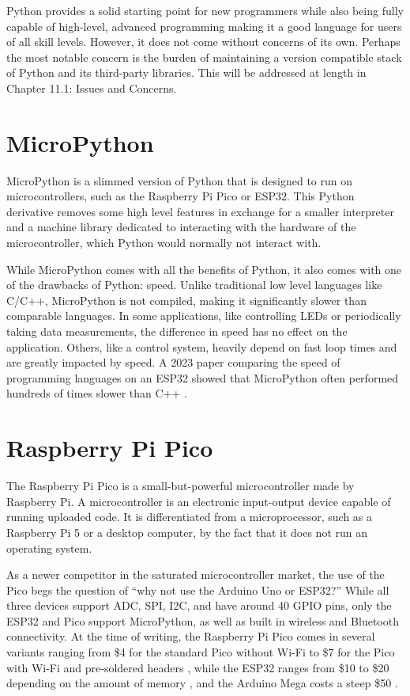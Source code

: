 Python provides a solid starting point for new programmers while also being fully capable of high-level,
advanced programming making it a good language for users of all skill levels. However, it does not come 
without concerns of its own. Perhaps the most notable concern is the burden of maintaining a version compatible
stack of Python and its third-party libraries. This will be addressed at length in Chapter 11.1: 
Issues and Concerns.

\section{MicroPython}

MicroPython is a slimmed version of Python that is designed to run on microcontrollers, such as the
Raspberry Pi Pico or ESP32. This Python derivative removes some high level features in exchange for
a smaller interpreter and a machine library dedicated to interacting with the hardware of the 
microcontroller, which Python would normally not interact with.

While MicroPython comes with all the benefits of Python, it also comes with one of the drawbacks
of Python: speed. Unlike traditional low level languages like C/C++, MicroPython is not compiled,
making it significantly slower than comparable languages. In some applications, like controlling LEDs
or periodically taking data measurements, the difference in
speed has no effect on the application. Others, like a control system, heavily depend on fast loop
times and are greatly impacted by speed. A 2023 paper comparing the speed of programming languages
on an ESP32 showed that MicroPython often performed hundreds of times slower than C++
\cite{language-speed}.

\section{Raspberry Pi Pico}

The Raspberry Pi Pico is a small-but-powerful microcontroller made by Raspberry Pi. A microcontroller
is an electronic input-output device capable of running uploaded code. It is differentiated
from a microprocessor, such as a Raspberry Pi 5 or a desktop computer, by the fact that it does not run 
an operating system. 

As a newer competitor in the saturated microcontroller market, the use of the Pico begs the question of 
``why not use the Arduino Uno or ESP32?'' While all three devices support ADC, SPI, I2C, and have 
around 40 GPIO pins, only the ESP32 and Pico support MicroPython, as well as built in wireless and 
Bluetooth connectivity. At the time of writing, the Raspberry Pi Pico comes in several variants ranging
from \$4 for the standard Pico without Wi-Fi to \$7 for the Pico with Wi-Fi and pre-soldered headers \cite{pico-price},
while the ESP32 ranges from \$10 to \$20 depending on the amount of memory \cite{esp32-price},
and the Arduino Mega costs a steep \$50 \cite{arduino-price}.

